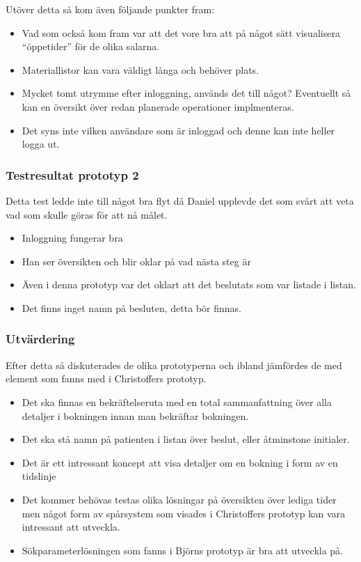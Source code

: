 \documentclass[a4paper,10pt]{article}
\begin{document}
Utöver detta så kom även följande punkter fram:
\begin{itemize}
\item Vad som också kom fram var att det vore bra att på något sätt visualisera “öppetider” för de olika salarna.
\item Materiallistor kan vara väldigt långa och behöver plats.
\item Mycket tomt utrymme efter inloggning, används det till något? Eventuellt så kan en översikt över redan planerade operationer implmenteras.
\item Det syns inte vilken användare som är inloggad och denne kan inte heller logga ut.
\end{itemize}
\subsubsection{Testresultat prototyp 2}
Detta test ledde inte till något bra flyt då Daniel upplevde det som svårt att veta vad som skulle göras för att nå målet.
\begin{itemize}
\item Inloggning fungerar bra
\item Han ser översikten och blir oklar på vad nästa steg är
\item Även i denna prototyp var det oklart att det beslutats som var listade i listan.
\item Det finns inget namn på besluten, detta bör finnas.
\end{itemize}

\subsubsection{Utvärdering}
Efter detta så diskuterades de olika prototyperna och ibland jämfördes de med element som fanns med i Christoffers prototyp.

\begin{itemize}
\item Det ska finnas en bekräftelseruta med en total sammanfattning över alla detaljer i bokningen innan man bekräftar bokningen.
\item Det ska stå namn på patienten i listan över beslut, eller åtminstone initialer.
\item Det är ett intressant koncept att visa detaljer om en bokning i form av en tidslinje
\item Det kommer behövas testas olika lösningar på översikten över lediga tider men något form av spårsystem som visades i Christoffers prototyp kan vara intressant att utveckla.
\item Sökparameterlösningen som fanns i Björns prototyp är bra att utveckla på.
\end{itemize}
\end{document}
